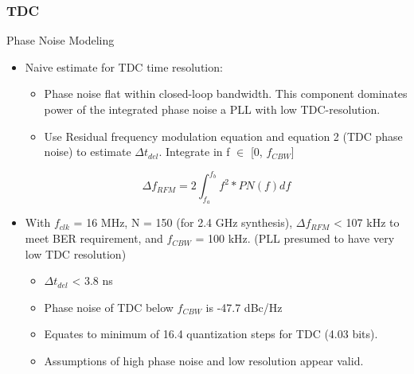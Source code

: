 \documentclass[t, screen, aspectratio=43]{beamer}
\begin{document}
\begin{frame}
	\frametitle{TDC}
	\begin{block}{Phase Noise Modeling}
		\begin{itemize}
			\footnotesize
			\item Naive estimate for TDC time resolution:
			\begin{itemize}
				\scriptsize
				\item Phase noise flat within closed-loop bandwidth. This component dominates power of the integrated phase noise a PLL with low TDC-resolution.
				\item Use Residual frequency modulation equation and equation 2 (TDC phase noise) to estimate $\Delta t_{del}$. Integrate in f $\in$ [0, $f_{CBW}$]
			\end{itemize} 
			\begin{equation}
				\Delta f_{RFM} = 2\int_{f_a}^{f_b}f^2*PN(f)df
			\end{equation}
			\item With $f_{clk}$ = 16 MHz, N = 150 (for 2.4 GHz synthesis), $\Delta f_{RFM}$ < 107 kHz to meet BER requirement, and $f_{CBW}$ = 100 kHz. (PLL presumed to have very low TDC resolution)
 			\begin{itemize}
				\scriptsize			
				\item $\Delta t_{del}$ < 3.8 ns
				\item Phase noise of TDC below $f_{CBW}$ is -47.7 dBc/Hz
				\item Equates to minimum of 16.4 quantization steps for TDC (4.03 bits).
				\item Assumptions of high phase noise and low resolution appear valid.

			\end{itemize} 
		\end{itemize}   
	\end{block}
\end{frame}


\end{document}
